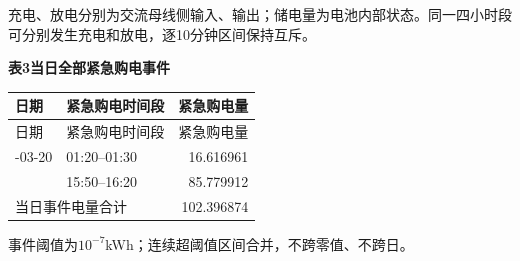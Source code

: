 \noindent 充电、放电分别为交流母线侧输入、输出；储电量为电池内部状态。同一四小时段可分别发生充电和放电，逐10分钟区间保持互斥。
\begin{center}\textbf{表3\quad 当日全部紧急购电事件}\end{center}
\begin{longtable}{llr}\toprule 日期 & 紧急购电时间段 & 紧急购电量\\\midrule\endfirsthead
\toprule 日期 & 紧急购电时间段 & 紧急购电量\\\midrule\endhead
\bottomrule\endfoot
2025-03-20 & 01:20--01:30 & 16.616961\\
 & 15:50--16:20 & 85.779912\\
\midrule\multicolumn{2}{l}{当日事件电量合计} & 102.396874\\
\end{longtable}
\noindent 事件阈值为$10^{-7}$kWh；连续超阈值区间合并，不跨零值、不跨日。
\endgroup
\clearpage
